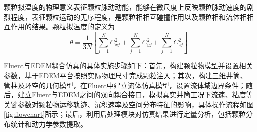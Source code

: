 颗粒拟温度的物理意义表征颗粒脉动动能，能够在微尺度上反映颗粒脉动速度的剧烈程度，表征颗粒运动的无序程度，是颗粒相相互碰撞作用以及颗粒相和流体相相互作用的结果。颗粒拟温度的定义为
\begin{equation}
	\theta=\frac{1}{3N}\left[
	\sum_{j=1}^{N}C_{xj}^{2}
	+\sum_{j=1}^{N}C_{yj}^{2}
	+\sum_{j=1}^{N}C_{zj}^{2}
	\right]
\end{equation}


Fluent与EDEM耦合仿真的具体实施步骤如下：首先，构建颗粒物模型并设置相关参数，基于EDEM平台按照实际物理尺寸完成颗粒注入；其次，构建三维井筒、管柱及环空的几何模型，在Fluent中建立流体仿真模型，设置流体域边界条件；随后，建立Fluent与EDEM之间的双向耦合接口，模拟真实井筒工况下流速、粘度等关键参数对颗粒物运移轨迹、沉积速率及空间分布特征的影响，具体操作流程如图\ref{fig:flowchart}所示；最后，利用后处理模块对仿真结果进行定量分析，包括颗粒分布统计和动力学参数提取。

